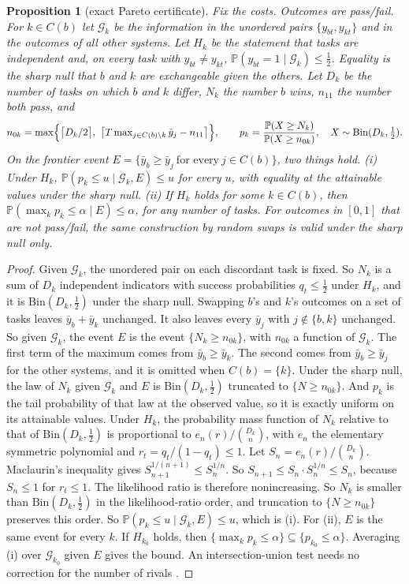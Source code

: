 \documentclass[11pt]{article}
\renewcommand{\Pr}{\mathbb{P}}
\newtheorem{proposition}{Proposition}
\begin{document}
\begin{proposition}[exact Pareto certificate]
\label{prop:exact}
Fix the costs. Outcomes are pass/fail. For $k\in C(b)$ let $\mathcal G_k$ be the information in the unordered pairs $\{y_{bt},y_{kt}\}$ and in the outcomes of all other systems. Let $H_k$ be the statement that tasks are independent and, on every task with $y_{bt}\ne y_{kt}$, $\Pr(y_{bt}=1\mid\mathcal G_k)\le\tfrac12$. Equality is the sharp null that $b$ and $k$ are exchangeable given the others. Let $D_k$ be the number of tasks on which $b$ and $k$ differ, $N_k$ the number $b$ wins, $n_{11}$ the number both pass, and
\[
n_{0k}=\max\Bigl\{\bigl\lceil D_k/2\bigr\rceil,\ \bigl\lceil T\max\nolimits_{j\in C(b)\setminus k}\bar y_j-n_{11}\bigr\rceil\Bigr\},\qquad
p_k=\frac{\Pr(X\ge N_k)}{\Pr(X\ge n_{0k})},\quad X\sim\mathrm{Bin}(D_k,\tfrac12).
\]
On the frontier event $E=\{\bar y_b\ge\bar y_j\ \text{for every}\ j\in C(b)\}$, two things hold. (i) Under $H_k$, $\Pr(p_k\le u\mid\mathcal G_k,E)\le u$ for every $u$, with equality at the attainable values under the sharp null. (ii) If $H_k$ holds for some $k\in C(b)$, then $\Pr(\max_k p_k\le\alpha\mid E)\le\alpha$, for any number of tasks. For outcomes in $[0,1]$ that are not pass/fail, the same construction by random swaps is valid under the sharp null only.
\end{proposition}
\begin{proof}
Given $\mathcal G_k$, the unordered pair on each discordant task is fixed. So $N_k$ is a sum of $D_k$ independent indicators with success probabilities $q_t\le\tfrac12$ under $H_k$, and it is $\mathrm{Bin}(D_k,\tfrac12)$ under the sharp null. Swapping $b$'s and $k$'s outcomes on a set of tasks leaves $\bar y_b+\bar y_k$ unchanged. It also leaves every $\bar y_j$ with $j\notin\{b,k\}$ unchanged. So given $\mathcal G_k$, the event $E$ is the event $\{N_k\ge n_{0k}\}$, with $n_{0k}$ a function of $\mathcal G_k$. The first term of the maximum comes from $\bar y_b\ge\bar y_k$. The second comes from $\bar y_b\ge\bar y_j$ for the other systems, and it is omitted when $C(b)=\{k\}$. Under the sharp null, the law of $N_k$ given $\mathcal G_k$ and $E$ is $\mathrm{Bin}(D_k,\tfrac12)$ truncated to $\{N\ge n_{0k}\}$. And $p_k$ is the tail probability of that law at the observed value, so it is exactly uniform on its attainable values. Under $H_k$, the probability mass function of $N_k$ relative to that of $\mathrm{Bin}(D_k,\tfrac12)$ is proportional to $e_n(r)/\binom{D_k}{n}$, with $e_n$ the elementary symmetric polynomial and $r_t=q_t/(1-q_t)\le1$. Let $S_n=e_n(r)/\binom{D_k}{n}$. Maclaurin's inequality gives $S_{n+1}^{1/(n+1)}\le S_n^{1/n}$. So $S_{n+1}\le S_n\cdot S_n^{1/n}\le S_n$, because $S_n\le1$ for $r_t\le1$. The likelihood ratio is therefore nonincreasing. So $N_k$ is smaller than $\mathrm{Bin}(D_k,\tfrac12)$ in the likelihood-ratio order, and truncation to $\{N\ge n_{0k}\}$ preserves this order. So $\Pr(p_k\le u\mid\mathcal G_k,E)\le u$, which is (i). For (ii), $E$ is the same event for every $k$. If $H_{k_0}$ holds, then $\{\max_kp_k\le\alpha\}\subseteq\{p_{k_0}\le\alpha\}$. Averaging (i) over $\mathcal G_{k_0}$ given $E$ gives the bound. An intersection-union test needs no correction for the number of rivals \citep{berger1982iu}.
\end{proof}
\end{document}
